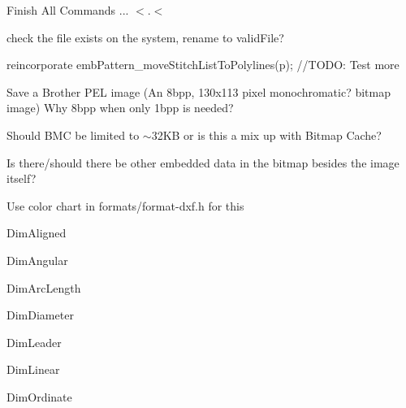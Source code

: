 \begin{DoxyRefList}
Finish All Commands ... \texorpdfstring{$<$}{<}.\texorpdfstring{$<$}{<} 
\item[Member \mbox{\hyperlink{class_main_window_af95b9b8dba27d822373f4424074bfde7}{Main\+Window\+::valid\+File\+Format}} (const QString \&file\+Name)]\label{todo__todo000004}%
%
check the file exists on the system, rename to valid\+File?  
\item[Member \mbox{\hyperlink{class_mdi_window_a8437f8fd71bcf6da5de2a49cbd0b105b}{Mdi\+Window\+::load\+File}} (const QString \&file\+Name)]\label{todo__todo000005}%
%
reincorporate emb\+Pattern\+\_\+move\+Stitch\+List\+To\+Polylines(p); //\+TODO\+: Test more  
\item[Member \mbox{\hyperlink{class_mdi_window_a2167cf71975c040208ae05b7b6b10a2f}{Mdi\+Window\+::save\+BMC}} ()]\label{todo__todo000006}%
%
Save a Brother PEL image (An 8bpp, 130x113 pixel monochromatic? bitmap image) Why 8bpp when only 1bpp is needed?

\label{todo__todo000007}%
%
Should BMC be limited to $\sim$32\+KB or is this a mix up with Bitmap Cache? 



Is there/should there be other embedded data in the bitmap besides the image itself?  
\item[Member \mbox{\hyperlink{embroidermodder_8h_a29bcbce98e36705fa9c1577a227d53c0a21cbc22cd57ac906315fac3d245a25b9}{OBJ\+\_\+\+LTYPE}} ]\label{todo__todo000002}%
%
Use color chart in formats/format-\/dxf.\+h for this  
\item[Member \mbox{\hyperlink{class_property_editor_af677b799a39d2374c702087e23fb6b3c}{Property\+Editor\+::clear\+All\+Fields}} ()]\label{todo__todo000020}%
%
Dim\+Aligned 



Dim\+Angular 



Dim\+Arc\+Length 



Dim\+Diameter 



Dim\+Leader 



Dim\+Linear 



Dim\+Ordinate 




\end{DoxyRefList}
